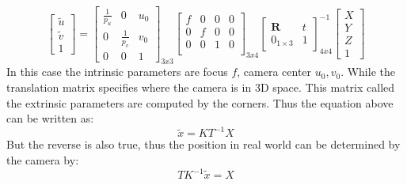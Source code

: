 \begin{equation}\label{eq:camera_transfer}
    \begin{bmatrix}
        \tilde{u} \\ \tilde{v} \\ 1
    \end{bmatrix} =
    \begin{bmatrix}
        \frac{1}{p_u} & 0 & u_0\\
        0 & \frac{1}{p_v} & v_0\\
        0 & 0 & 1
    \end{bmatrix}_{3x3}
    \begin{bmatrix}
        f & 0 & 0 & 0\\
        0 & f & 0 & 0\\
        0 & 0 & 1 & 0\\
    \end{bmatrix}_{3x4}
    \begin{bmatrix}
        \mathbf{R} & t \\
        0_{1\times 3} & 1
    \end{bmatrix}^{-1}_{4x4}
    \begin{bmatrix}
        X \\ Y \\ Z \\ 1
    \end{bmatrix}
\end{equation}
In this case the intrinsic parameters are focus $f$, camera center $u_0,v_0$.
While the translation matrix specifies where the camera is in 3D space.
This matrix called the extrinsic parameters are computed by the \aruco corners.
Thus the equation above can be written as:
\begin{equation}
    \tilde{x}  = KT^{-1}X
\end{equation}
But the reverse is also true, thus the position in real world can be determined by the camera by:
\begin{equation}\label{eq:meth:xtoX}
    TK^{-1}\tilde{x} = X
\end{equation}


